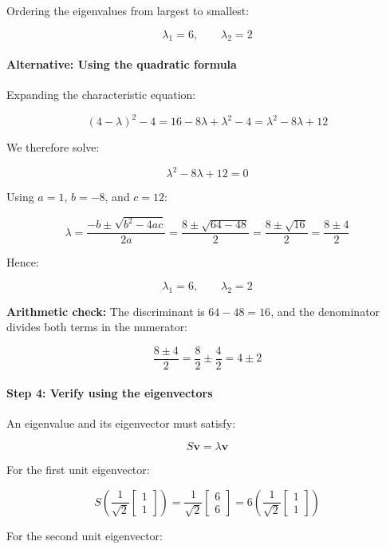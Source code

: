 \documentclass[11pt]{article}
\begin{document}
Ordering the eigenvalues from largest to smallest:

\[
\boxed{\lambda_1=6,\qquad\lambda_2=2}
\]

\paragraph{Alternative: Using the quadratic
formula}\label{alternative-using-the-quadratic-formula}

Expanding the characteristic equation:

\[
(4-\lambda)^2-4
=
16-8\lambda+\lambda^2-4
=
\lambda^2-8\lambda+12
\]

We therefore solve:

\[
\lambda^2-8\lambda+12=0
\]

Using \(a=1\), \(b=-8\), and \(c=12\):

\[
\lambda
=
\frac{-b\pm\sqrt{b^2-4ac}}{2a}
=
\frac{8\pm\sqrt{64-48}}{2}
=
\frac{8\pm\sqrt{16}}{2}
=
\frac{8\pm4}{2}
\]

Hence:

\[
\boxed{\lambda_1=6,\qquad\lambda_2=2}
\]

\textbf{Arithmetic check:} The discriminant is \(64-48=16\), and the
denominator divides both terms in the numerator:

\[
\frac{8\pm4}{2}
=
\frac{8}{2}\pm\frac{4}{2}
=
4\pm2
\]

\paragraph{Step 4: Verify using the
eigenvectors}\label{step-4-verify-using-the-eigenvectors}

An eigenvalue and its eigenvector must satisfy:

\[
S\mathbf{v}=\lambda\mathbf{v}
\]

For the first unit eigenvector:

\[
S\left(
\frac{1}{\sqrt{2}}
\begin{bmatrix}
1\\
1
\end{bmatrix}
\right)
=
\frac{1}{\sqrt{2}}
\begin{bmatrix}
6\\
6
\end{bmatrix}
=
6\left(
\frac{1}{\sqrt{2}}
\begin{bmatrix}
1\\
1
\end{bmatrix}
\right)
\]

For the second unit eigenvector:
\end{document}
